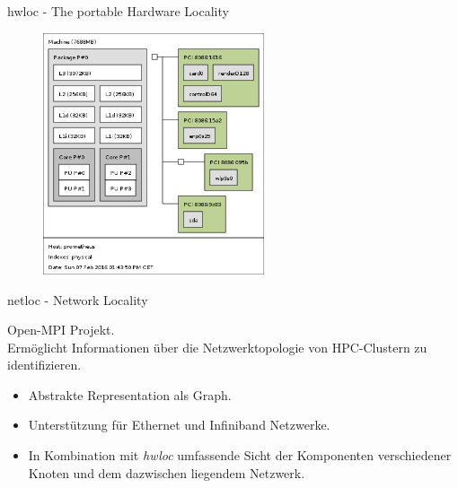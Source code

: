 \begin{frame}{hwloc - The portable Hardware Locality}

    \begin{figure}
        \centering
        \includegraphics[width=0.58\textwidth]{fig/prometheus.png}
    \end{figure}
\end{frame}


\begin{frame}{netloc - Network Locality}

    Open-MPI Projekt.\\
    Erm\"{o}glicht Informationen \"{u}ber die Netzwerktopologie von HPC-Clustern zu identifizieren.
    \begin{itemize}
        \item Abstrakte Representation als Graph.
        \item Unterst\"{u}tzung f\"{u}r Ethernet und Infiniband Netzwerke.
        \item In Kombination mit \emph{hwloc} umfassende Sicht der Komponenten
            verschiedener Knoten und dem dazwischen liegendem Netzwerk.
    \end{itemize}



\end{frame}


